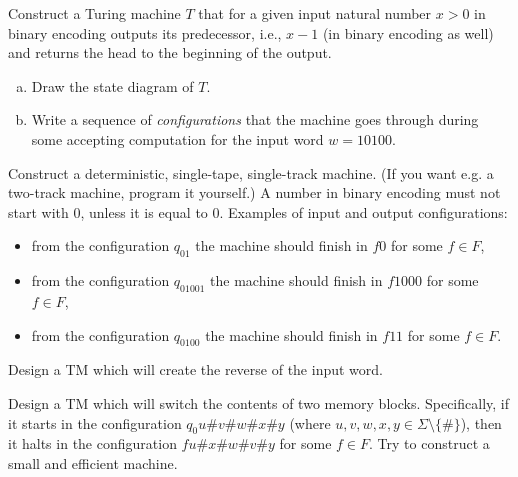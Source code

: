 \documentclass[a4paper,12pt]{amsart}
\begin{document}
\medskip\begin{problem}[Predecessor]
	
    Construct a Turing machine $T$ that for a given input natural number $x>0$ in binary encoding outputs its predecessor, i.e., $x-1$ (in binary encoding as well) and returns the head to the beginning of the output. %
	
	\smallskip
	\begin{enumerate}[(a)]
	
		\item Draw the state diagram of $T$.
		\item Write a sequence of \emph{configurations} that the machine goes through during some accepting computation for the input word $w=10100$.

	\end{enumerate}

	Construct a deterministic, single-tape, single-track machine. (If you want e.g. a two-track machine, program it yourself.) A number in binary encoding must not start with 0, unless it is equal to 0. Examples of input and output configurations:	
	
	\begin{itemize}
	
		\item from the configuration $q_01$ the machine should finish in $f0$ for some $f\in F$,
		\item from the configuration $q_01001$ the machine should finish in $f1000$ for some $f\in F$,
		\item from the configuration  $q_0100$ the machine should finish in $f11$ for some $f\in F$.
	\end{itemize}

\end{problem}
    
    
\medskip\begin{problem}[Reverse]
    
    Design a TM which will create the reverse of the input word.

\end{problem}
    

\begin{problem}

    Design a TM which will switch the contents of two memory blocks. Specifically, if it starts in the configuration $q_0u\#v\#w\#x\#y$ (where $u, v, w, x, y \in \Sigma\setminus\{\#\}$), then it halts in the configuration $fu\#x\#w\#v\#y$ for some $f\in F$. Try to construct a small and efficient machine.

\end{problem}
    
\end{document}
